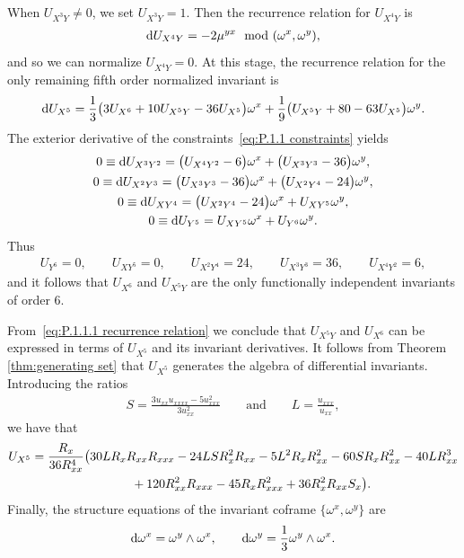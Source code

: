 \documentclass[10pt,a4paper]{amsart}
\numberwithin{equation}{section}
\begin{document}
When $U_{X^3Y}\neq 0$, we set $U_{X^3Y}=1$. Then the recurrence relation for $U_{X^4Y}$ is
\begin{gather*}
{\rm d}U_{X^4Y} = -2\mu^{yx} \mod (\omega^x,\omega^y),
\end{gather*}
and so we can normalize $U_{X^4Y}=0$. At this stage, the recurrence relation for the only remaining fifth order normalized invariant is
%
\begin{gather}\label{eq:P.1.1.1 recurrence relation}
{\rm d}U_{X^5} = \frac{1}{3}\big(3U_{X^6}+10U_{X^5Y}-36U_{X^5}\big)\omega^x+\frac{1}{9}\big(U_{X^5Y}+80-63U_{X^5}\big)\omega^y.
\end{gather}
%
The exterior derivative of the constraints~\eqref{eq:P.1.1 constraints} yields
\begin{gather*}
0 \equiv {\rm d}U_{X^3Y^2} = \big(U_{X^4Y^2}-6\big)\omega^x+\big(U_{X^3Y^3}-36\big)\omega^y,\\
0 \equiv {\rm d}U_{X^2Y^3} = \big(U_{X^3Y^3}-36\big)\omega^x+\big(U_{X^2Y^4}-24\big)\omega^y,\\
0 \equiv {\rm d}U_{XY^4} = \big(U_{X^2Y^4}-24\big)\omega^x+U_{XY^5}\omega^y,\\
0 \equiv {\rm d}U_{Y^5} = U_{XY^5}\omega^x + U_{Y^6}\omega^y.
\end{gather*}
%
Thus
\begin{gather*}
U_{Y^6}=0,\qquad U_{XY^5}=0,\qquad U_{X^2Y^4}=24,\qquad U_{X^3Y^3}=36,\qquad
U_{X^4Y^2}=6,
\end{gather*}
and it follows that $U_{X^6}$ and $U_{X^5Y}$ are the only functionally independent invariants of order 6.

From~\eqref{eq:P.1.1.1 recurrence relation} we conclude that $U_{X^5Y}$ and $U_{X^6}$ can be expressed in terms of $U_{X^5}$ and its invariant derivatives. It follows from Theorem \ref{thm:generating set} that $U_{X^5}$ generates the algebra of differential invariants. Introducing the ratios
\begin{gather*}
S = \frac{3u_{xx} u_{xxxx} - 5 u_{xxx}^2}{3u_{xx}^2}\qquad\text{and}\qquad L=\frac{u_{xxx}}{u_{xx}},
\end{gather*}
we have that
%
\begin{gather*}
U_{X^5} = \frac{R_x}{36R_{xx}^4}\big(30 L R_x R_{xx} R_{xxx} -24 L S R_x^2 R_{xx} - 5L^2R_x R_{xx}^2 - 60 S R_x R_{xx}^2 - 40 L R_{xx}^3
\\ \hphantom{U_{X^5} =}
{}+ 120 R_{xx}^2 R_{xxx} - 45R_xR_{xxx}^2 + 36 R_x^2 R_{xx} S_x\big).
\end{gather*}
%
Finally, the structure equations of the invariant coframe $\{\omega^x,\omega^y\}$ are
\begin{gather*}
{\rm d}\omega^x = \omega^y \wedge \omega^x,\qquad {\rm d}\omega^y = \frac{1}{3}\omega^y\wedge\omega^x.
\end{gather*}
\end{document}
